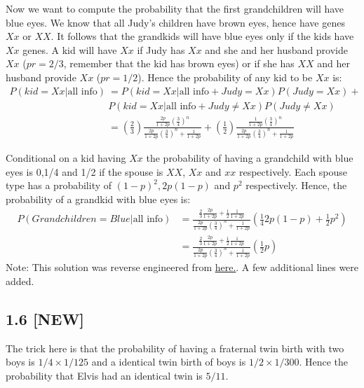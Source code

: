 \documentclass[]{article}
\begin{document}
Now we want to compute the probability that the first grandchildren will
have blue eyes. We know that all Judy's children have brown eyes, hence
have genes \(Xx\) or \(XX\). It follows that the grandkids will have
blue eyes only if the kids have \(Xx\) genes. A kid will have \(Xx\) if
Judy has \(Xx\) and she and her husband provide \(Xx\) (\(pr=2/3\),
remember that the kid has brown eyes) or if she has \(XX\) and her
husband provide \(Xx\) (\(pr=1/2\)). Hence the probability of any kid to
be \(Xx\) is: \[
\begin{aligned}
P(kid = Xx| \text{all info}) &= P(kid = Xx| \text{all info} + Judy = Xx)P(Judy = Xx) + \\  &P(kid = Xx| \text{all info} + Judy \neq Xx)P(Judy \neq Xx) \nonumber \\
&= \left( \frac{2}{3} \right) \frac{ \frac{2p}{1+2p} (\frac{3}{4})^{n} }{ \frac{2p}{1+2p} (\frac{3}{4})^{n} + \frac{1}{1+2p} } + \left( \frac{1}{2} \right) \frac{ \frac{1}{1+2p} (\frac{3}{4})^{n} }{ \frac{2p}{1+2p} (\frac{3}{4})^{n} + \frac{1}{1+2p} }
\end{aligned}
\]

Conditional on a kid having \(Xx\) the probability of having a
grandchild with blue eyes is 0,1/4 and 1/2 if the spouse is \(XX\),
\(Xx\) and \(xx\) respectively. Each spouse type has a probability of
\((1-p)^{2}, 2p(1-p)\) and \(p^2\) respectively. Hence, the probability
of a grandkid with blue eyes is: \[
\begin{aligned}
P(Grandchildren = Blue|\text{all info}) &=  \frac{ \frac{2}{3}\frac{2p}{1+2p} + \frac{1}{2}\frac{1}{1+2p} }{\frac{2p}{1+2p} (\frac{3}{4})^{n} + \frac{1}{1+2p} } \left( \frac{1}{4}2p(1-p) + \frac{1}{2}p^{2} \right) \\ 
&= \frac{ \frac{2}{3}\frac{2p}{1+2p} + \frac{1}{2}\frac{1}{1+2p} }{\frac{2p}{1+2p} (\frac{3}{4})^{n} + \frac{1}{1+2p} } \left( \frac{1}{2}p \right) \nonumber
\end{aligned}
\] Note: This solution was reverse engineered from
\href{http://www.stat.columbia.edu/~gelman/book/solutions3.pdf}{here.}.
A few additional lines were added.

\subsection{\texorpdfstring{1.6
\textbf{{[}NEW{]}}}{1.6 {[}NEW{]}}}\label{new-1}

The trick here is that the probability of having a fraternal twin birth
with two boys is \(1/4 \times 1/125\) and a identical twin birth of boys
is \(1/2 \times 1/300\). Hence the probability that Elvis had an
identical twin is \(5/11\).
\end{document}
